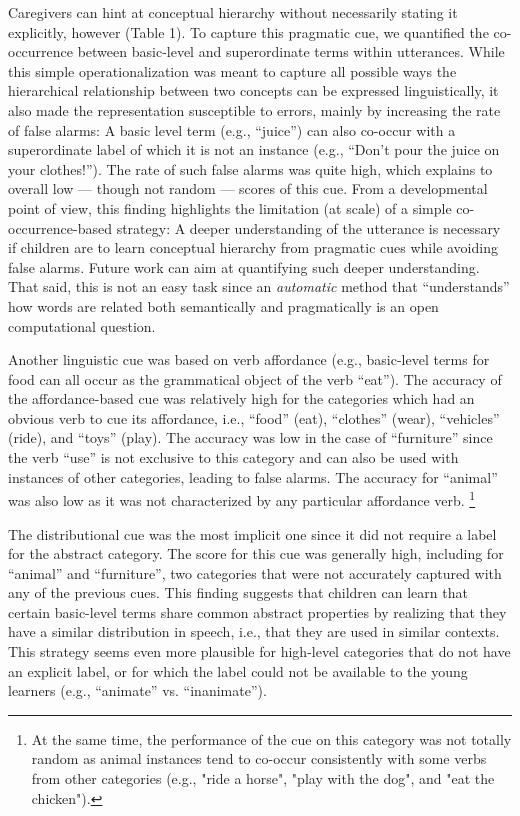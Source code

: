\documentclass[english,,man,floatsintext]{apa6}
\let\rmarkdownfootnote\footnote%
\def\footnote{\protect\rmarkdownfootnote}
\begin{document}
Caregivers can hint at conceptual hierarchy without necessarily stating it explicitly, however (Table 1). To capture this pragmatic cue, we quantified the co-occurrence between basic-level and superordinate terms within utterances. While this simple operationalization was meant to capture all possible ways the hierarchical relationship between two concepts can be expressed linguistically, it also made the representation susceptible to errors, mainly by increasing the rate of false alarms: A basic level term (e.g., \enquote{juice}) can also co-occur with a superordinate label of which it is not an instance (e.g., \enquote{Don't pour the juice on your clothes!}). The rate of such false alarms was quite high, which explains to overall low --- though not random --- scores of this cue. From a developmental point of view, this finding highlights the limitation (at scale) of a simple co-occurrence-based strategy: A deeper understanding of the utterance is necessary if children are to learn conceptual hierarchy from pragmatic cues while avoiding false alarms. Future work can aim at quantifying such deeper understanding. That said, this is not an easy task since an \emph{automatic} method that ``understands'' how words are related both semantically and pragmatically is an open computational question.

Another linguistic cue was based on verb affordance (e.g., basic-level terms for food can all occur as the grammatical object of the verb \enquote{eat}). The accuracy of the affordance-based cue was relatively high for the categories which had an obvious verb to cue its affordance, i.e., \enquote{food} (eat), \enquote{clothes} (wear), \enquote{vehicles} (ride), and \enquote{toys} (play). The accuracy was low in the case of \enquote{furniture} since the verb \enquote{use} is not exclusive to this category and can also be used with instances of other categories, leading to false alarms. The accuracy for
\enquote{animal} was also low as it was not characterized by any particular affordance verb. \footnote{At the same time, the performance of the cue on this category was not totally random as animal instances tend to co-occur consistently with some verbs from other categories (e.g., "ride a horse", "play with the dog", and "eat the chicken").}

The distributional cue was the most implicit one since it did not require a label for the abstract category. The score for this cue was generally high, including for \enquote{animal} and \enquote{furniture}, two categories that were not accurately captured with any of the previous
cues. This finding suggests that children can learn that certain basic-level terms share common abstract properties by realizing that they have a similar distribution in speech, i.e., that they are used in similar contexts. This strategy seems even more plausible for high-level categories that do not have an explicit label, or for which the label could not be available to the young learners (e.g., \enquote{animate} vs. \enquote{inanimate}).
\end{document}
